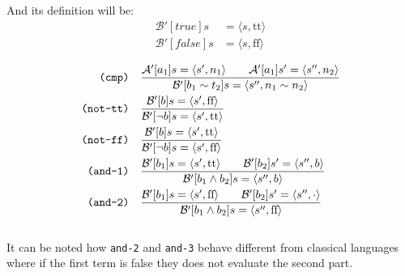 \documentclass{article}
\newcommand{\lf}{\text{f}\text{f}}
\newcommand{\lt}{\text{t}\text{t}}
\begin{document}
And its definition will be:
$$ 
    \begin{aligned}
        \mathcal{B}'[true]s  &= \langle s, \lt\rangle \\
        \mathcal{B}'[false]s &= \langle s, \lf \rangle \\
    \end{aligned}
$$
$$
\begin{aligned}
    \texttt{(cmp)} \quad & \frac
        {\mathcal{A}'[a_1]s = \langle s', n_1\rangle \quad\quad \mathcal{A}'[a_1]s' = \langle s'', n_2\rangle}
        {\mathcal{B}'[b_1 \sim t_2]s = \langle s'', n_1 \sim n_2 \rangle} \\
    \texttt{(not-\lt)} \quad & \frac
        {\mathcal{B}'[b]s = \langle s', \lf\rangle}
        {\mathcal{B}'[\lnot b]s = \langle s', \lt \rangle} \\
    \texttt{(not-\lf)} \quad & \frac
        {\mathcal{B}'[b]s = \langle s', \lt\rangle}
        {\mathcal{B}'[\lnot b]s = \langle s', \lf \rangle} \\
    \texttt{(and-1)} \quad & \frac
        {\mathcal{B}'[b_1]s = \langle s', \lt\rangle \quad\quad \mathcal{B}'[b_2]s' = \langle s'', b\rangle}
        {\mathcal{B}'[b_1 \land b_2]s = \langle s'', b \rangle} \\
    \texttt{(and-2)} \quad & \frac
        {\mathcal{B}'[b_1]s = \langle s',\lf\rangle \quad\quad \mathcal{B}'[b_2]s' = \langle s'', \cdot\rangle}
        {\mathcal{B}'[b_1 \land b_2]s = \langle s'', \lf \rangle} \\
\end{aligned}
$$
\\
It can be noted how \texttt{and-2} and \texttt{and-3} behave different from classical languages where if the first term is false they does not evaluate the second part.
\end{document}
